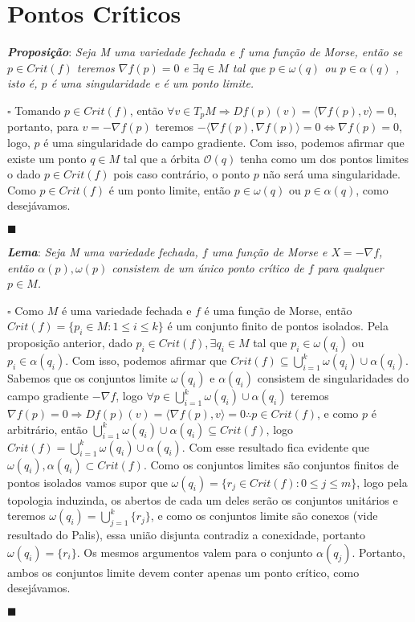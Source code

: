 \documentclass[12pt]{book}
\newcommand{\tese}[3]{\vspace{2mm} \textit{\textbf{#1}}: \textit{#2} \par $\square$ #3 \par $\blacksquare$}
\newcommand{\innerprod}[2]{\langle #1, #2 \rangle}
\begin{document}
	\section{Pontos Críticos}
	
	\tese{Proposição}{Seja M uma variedade fechada e $f$ uma função de Morse, então se $p \in Crit(f)$ teremos $\nabla f(p)=0$ e $\exists q \in M$ tal que $p \in \omega(q)$ ou $p \in \alpha(q)$ , isto é, $p$ é uma singularidade e é um ponto limite.}{Tomando $p \in Crit(f)$, então $\forall v \in T_{p}M \Rightarrow Df(p)(v) = \innerprod{\nabla f(p)}{v} = 0$, portanto, para $v = -\nabla f(p)$ teremos $-\innerprod{\nabla f(p)}{\nabla f(p)} = 0 \iff \nabla f(p) = 0$, logo, $p$ é uma singularidade do campo gradiente. Com isso, podemos afirmar que existe um ponto $q \in M$ tal que a órbita $\mathcal{O}(q)$ tenha como um dos pontos limites o dado $p \in Crit(f)$ pois caso contrário, o ponto $p$ não será uma singularidade. Como $p \in Crit(f)$ é um ponto limite, então $p \in \omega(q)$ ou $p \in \alpha(q)$, como desejávamos.}
	
	\tese{Lema}{Seja M uma variedade fechada, $f$ uma função de Morse e $X =-\nabla f$, então $\alpha(p), \omega(p)$ consistem de um único ponto crítico de $f$ para qualquer $p \in M$.}
	{Como $M$ é uma variedade fechada e $f$ é uma função de Morse, então $Crit(f) = \{p_{i} \in M: 1\leq i \leq k \}$ é um conjunto finito de pontos isolados. Pela proposição anterior, dado $p_{i} \in Crit(f), \exists q_{i} \in M$ tal que $p_{i} \in \omega(q_{i})$ ou $p_{i} \in \alpha(q_{i})$. Com isso, podemos afirmar que $Crit(f) \subseteq \bigcup_{i=1}^{k}\omega(q_{i}) \cup \alpha(q_{i})$. Sabemos que os conjuntos limite $\omega(q_{i})$ e $\alpha(q_{i})$ consistem de singularidades do campo gradiente $-\nabla f$, logo $\forall p \in \bigcup_{i=1}^{k}\omega(q_{i}) \cup \alpha(q_{i})$ teremos $\nabla f(p) = 0 \Rightarrow Df(p)(v) = \innerprod{\nabla f(p)}{v} = 0 \therefore p \in Crit(f)$, e como $p$ é arbitrário, então $\bigcup_{i=1}^{k}\omega(q_{i}) \cup \alpha(q_{i}) \subseteq Crit(f)$, logo $Crit(f) = \bigcup_{i=1}^{k}\omega(q_{i}) \cup \alpha(q_{i})$. Com esse resultado fica evidente que $\omega(q_{i}), \alpha(q_{i}) \subset Crit(f)$. Como os conjuntos limites são conjuntos finitos de pontos isolados vamos supor que $\omega(q_{i}) = \{r_{j} \in Crit(f): 0\leq j \leq m\}$, logo pela topologia induzinda, os abertos de cada um deles serão os conjuntos unitários e teremos $\omega(q_{i}) = \bigcup_{j=1}^{k} \{r_{j}\} $, e como os conjuntos limite são conexos (vide resultado do Palis), essa união disjunta contradiz a conexidade, portanto $\omega(q_{i}) = \{r_{i}\}$. Os mesmos argumentos valem para o conjunto $\alpha(q_{j})$. Portanto, ambos os conjuntos limite devem conter apenas um ponto crítico, como desejávamos.}
	
\end{document}
